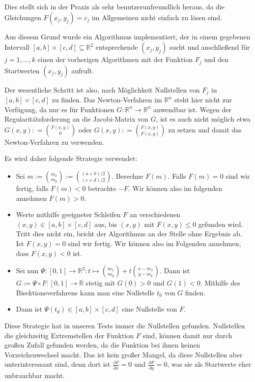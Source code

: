 \documentclass[a4paper,11pt,bibliography=totoc,listof=totoc,headinclude=true,cleardoublepage=empty,oneside]{scrartcl}
\newcommand{\R}{\mathbb{R}}
\renewcommand{\subset}{\subseteq}
\newcommand{\diff}[2]{\frac{\partial #1}{\partial #2}}
\begin{document}
Dies stellt sich in der Praxis als sehr benutzerunfreundlich heraus, da die Gleichungen $F(x_j,y_j)=c_j$ im Allgemeinen nicht einfach zu lösen sind. 

Aus diesem Grund wurde ein Algorithmus implementiert, der in einem gegebenen Intervall $[a,b]\times[c,d] \subset \R^2$ entsprechende $(x_j,y_j)$ sucht und anschließend für $j=1,\dots, k$ einen der vorherigen Algorithmen mit der Funktion $F_j$ und den Startwerten $(x_j,y_j)$ aufruft. 

Der wesentliche Schritt ist also, nach Möglichkeit Nullstellen von $F_j$ in $[a,b] \times [c,d]$ zu finden. Das Newton-Verfahren im $\R^n$ steht hier nicht zur Verfügung, da nur es für Funktionen $G: \R^n \to \R^n$ anwendbar ist. Wegen der Regularitätsforderung  an die Jacobi-Matrix von $G$, ist es auch nicht möglich etwa $G(x,y) : = \binom{F(x,y)}{0}$ oder $G(x,y) : = \binom{F(x,y)}{F(x,y)}$ zu setzen und damit das Newton-Verfahren zu verwenden.

Es wird daher folgende Strategie verwendet:
\begin{itemize}
	\item Sei $m:= \binom{m_x}{m_y} := \binom{(a+b)/2}{(c+d)/2}$. Berechne $F(m)$. Falls $F(m)=0$ sind wir fertig, falls $F(m)<0$ betrachte $-F$. Wir können also im folgenden annehmen $F(m)>0$.
	\item Werte mithilfe geeigneter Schleifen $F$ an verschiedenen $(x,y) \in [a,b]\times [c,d]$ aus, bis $(x,y)$ mit $F(x,y)\le 0$ gefunden wird. Tritt dies nicht ein, bricht der Algorithmus an der Stelle ohne Ergebnis ab. Ist $F(x,y)=0$ sind wir fertig. Wir können also im Folgenden annehmen, dass $F(x,y)<0$ ist.
	\item Sei nun $\Psi : [0,1] \to \R^2 : t \mapsto \binom{m_x}{m_y} + t \binom{x-m_x}{y-m_y}$. Dann ist $ G:= \Psi \circ F : [0,1] \to \R$ stetig mit $G(0)>0$ und $G(1)<0$. Mithilfe des Bisektionsverfahrens kann man eine Nullstelle $t_0$ von $G$ finden.
	\item Dann ist $\Psi(t_0) \in [a,b] \times [c,d]$ eine Nullstelle von $F$.
\end{itemize} 
Diese Strategie hat in unseren Tests immer die Nullstellen gefunden. Nullstellen die gleichzeitig Extremstellen der Funktion $F$ sind, können damit nur durch großen Zufall gefunden werden, da die Funktion bei ihnen keinen Vorzeichenwechsel macht. Das ist kein großer Mangel, da diese Nullstellen aber unterinteressant sind, denn dort ist $\diff{F}{x}=0$ und $\diff{F}{y}=0$, was sie als Startwerte eher unbrauchbar macht.
\end{document}
